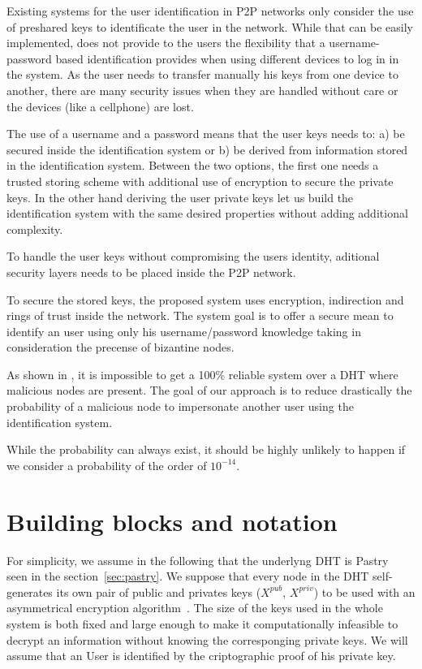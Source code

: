 Existing systems for the user identification in P2P networks only consider the
use of preshared keys to identificate the user in the network. While that can
be easily implemented, does not provide to the users the flexibility that a
username-password based identification provides when using different devices to
log in in the system. As the user needs to transfer manually his keys from one
device to another, there are many security issues when they are handled without
care or the devices (like a cellphone) are lost. 

The use of a username and a password means that the user keys needs to: a) be
secured inside the identification system or b) be derived from information
stored in the identification system. Between  the two options, the first one
needs a trusted storing scheme with additional use of encryption to secure the
private keys. In the other hand deriving the user private keys let us build the
identification system with the same desired properties without adding
additional complexity.

To handle the user keys without compromising the users identity, aditional
security layers needs to be placed inside the P2P network.

To secure the stored keys, the proposed system uses encryption, indirection and
rings of trust inside the network. The system goal is to offer a secure mean to
identify an user using only his username/password knowledge taking in
consideration the precense of bizantine nodes.

As shown in \cite{the_sybil_attack}, it is impossible to get a 100\% reliable
system over a DHT where malicious nodes are present. The goal of our approach
is to reduce drastically the probability of a malicious node to impersonate
another user using the identification system.

While the probability can always exist, it should be highly unlikely to happen
if we consider a probability of the order of $10^{-14}$.

\section{Building blocks and notation}

For simplicity, we assume in the following that the underlyng DHT is
Pastry~\cite{pastry} seen in the section~\ref{sec:pastry}. We suppose that
every node in the DHT self-generates its own pair of public and privates keys
($X^{pub}$, $X^{priv}$) to be used with an asymmetrical encryption
algorithm~\cite{asymmetrical_encryption_algorithm}. The size of the keys used
in the whole system is both fixed and large enough to make it computationally
infeasible to decrypt an information without knowing the corresponging private
keys. We will assume that an User is identified by the criptographic proof of
his private key. 

